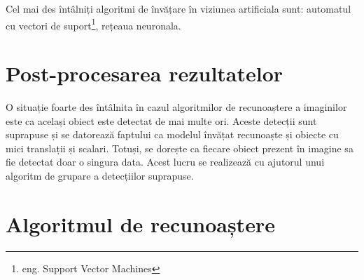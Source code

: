 Cel mai des întâlniți algoritmi de învățare în viziunea artificiala sunt: automatul cu vectori de suport\footnote{eng. Support Vector Machines}, rețeaua neuronala.

\pagebreak
\section{Post-procesarea rezultatelor}

O situație foarte des întâlnita în cazul algoritmilor de recunoaștere a imaginilor este ca același obiect este detectat de mai multe ori.
Aceste detecții sunt suprapuse și se datorează faptului ca modelul învățat recunoaște și obiecte cu mici translații și scalari.
Totuși, se dorește ca fiecare obiect prezent în imagine sa fie detectat doar o singura data.
Acest lucru se realizează cu ajutorul unui algoritm de grupare a detecțiilor suprapuse.

\pagebreak
\section{Algoritmul de recunoaștere}





















